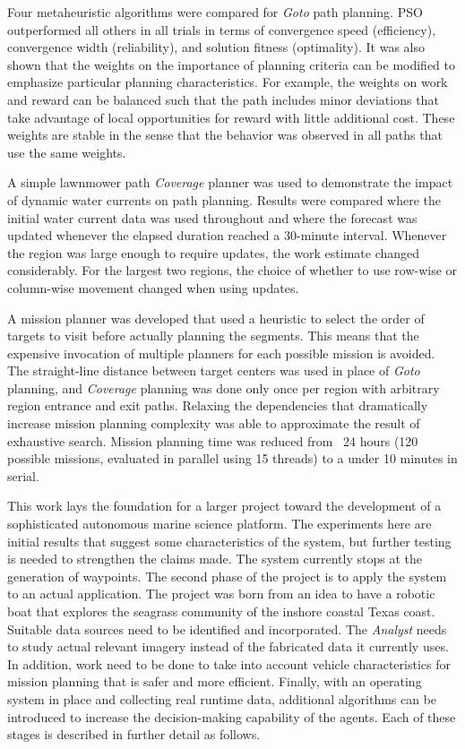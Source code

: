 \documentclass{tamuccthesis}
\begin{document}
Four metaheuristic algorithms were compared for \textit{Goto} path planning. PSO outperformed all others in all trials in terms of convergence speed (efficiency), convergence width (reliability), and solution fitness (optimality). It was also shown that the weights on the importance of planning criteria can be modified to emphasize particular planning characteristics. For example, the weights on work and reward can be balanced such that the path includes minor deviations that take advantage of local opportunities for reward with little additional cost. These weights are stable in the sense that the behavior was observed in all paths that use the same weights. 

A simple lawnmower path \textit{Coverage} planner was used to demonstrate the impact of dynamic water currents on path planning. Results were compared where the initial water current data was used throughout and where the forecast was updated whenever the elapsed duration reached a 30-minute interval. Whenever the region was large enough to require updates, the work estimate changed considerably. For the largest two regions, the choice of whether to use row-wise or column-wise movement changed when using updates. 

A mission planner was developed that used a heuristic to select the order of targets to visit before actually planning the segments. This means that the expensive invocation of multiple planners for each possible mission is avoided. The straight-line distance between target centers was used in place of \textit{Goto} planning, and \textit{Coverage} planning was done only once per region with arbitrary region entrance and exit paths. Relaxing the dependencies that dramatically increase mission planning complexity was able to approximate the result of exhaustive search. Mission planning time was reduced from ~24 hours (120 possible missions, evaluated in parallel using 15 threads) to a under 10 minutes in serial. 

This work lays the foundation for a larger project toward the development of a sophisticated autonomous marine science platform. The experiments here are initial results that suggest some characteristics of the system, but further testing is needed to strengthen the claims made. The system currently stops at the generation of waypoints. The second phase of the project is to apply the system to an actual application. The project was born from an idea to have a robotic boat that explores the seagrass community of the inshore coastal Texas coast. Suitable data sources need to be identified and incorporated. The \textit{Analyst} needs to study actual relevant imagery instead of the fabricated data it currently uses. In addition, work need to be done to take into account vehicle characteristics for mission planning that is safer and more efficient. Finally, with an operating system in place and collecting real runtime data, additional algorithms can be introduced to increase the decision-making capability of the agents. Each of these stages is described in further detail as follows.
\end{document}
